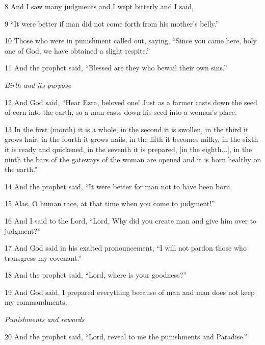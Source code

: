 \par 8 And I saw many judgments and I wept bitterly and I said, 

\par 9 “It were better if man did not come forth from his mother's belly.”

\par 10 Those who were in punishment called out, saying, “Since you came here, holy one of God, we have obtained a slight respite.”

\par 11 And the prophet said, “Blessed are they who bewail their own sins.”

\par \textit{Birth and its purpose}

\par 12 And God said, “Hear Ezra, beloved one! Just as a farmer casts down the seed of corn into the earth, so a man casts down his seed into a woman's place.

\par 13 In the first (month) it is a whole, in the second it is swollen, in the third it grows hair, in the fourth it grows nails, in the fifth it becomes milky, in the sixth it is ready and quickened, in the seventh it is prepared, [in the eighth...], in the ninth the bars of the gateways of the woman are opened and it is born healthy on the earth.”

\par 14 And the prophet said, “It were better for man not to have been born. 

\par 15 Alas, O human race, at that time when you come to judgment!”

\par 16 And I said to the Lord, “Lord, Why did you create man and give him over to judgment?”

\par 17 And God said in his exalted pronouncement, “I will not pardon those who transgress my covenant.”

\par 18 And the prophet said, “Lord, where is your goodness?” 

\par 19 And God said, I prepared everything because of man and man does not keep my commandments.

\par \textit{Punishments and rewards}

\par 20 And the prophet said, “Lord, reveal to me the punishments and Paradise.”

